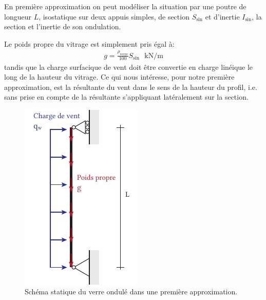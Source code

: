 \documentclass[11pt,titlepage]{article}
\begin{document}
En première approximation on peut modéliser la situation par une poutre de longueur $L$, isostatique sur deux appuis simples, de section $S_{\text{sin}}$ et d'inertie $I_{\text{sin}}$, la section et l'inertie de son ondulation.



Le poids propre du vitrage est simplement pris égal à: 
\begin{align}
    g = \frac{\rho_{\text{verre}}}{100} S_{\text{sin}} \text{ }\unit{\kilo\newton/\meter}
\end{align}
tandis que la charge surfacique de vent doit être convertie en charge linéique le long de la hauteur du vitrage. Ce qui nous intéresse, pour notre première approximation, est la résultante du vent dans le sens de la hauteur du profil, i.e. sans prise en compte de la résultante s'appliquant latéralement sur la section.
\begin{figure}
    \includegraphics[width=\linewidth]{img/ondul/schem_stat.pdf}
       \caption{Schéma statique du verre ondulé dans une première approximation.}
   \label{fig:ondul_stat}
   \end{figure}
\end{document}
